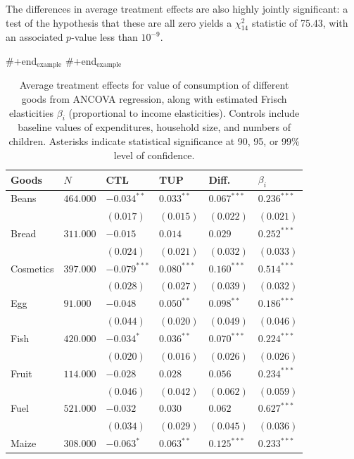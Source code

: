 \documentclass[12pt,letterpaper]{article}
\begin{document}
The differences in average treatment effects are also highly jointly
significant: a test of the hypothesis that these are all zero
yields a \(\chi^2_{14}\) statistic of 75.43, with an associated
\(p\)-value less than \(10^{-9}\).  

\#+end\(_{\text{example}}\)
\#+end\(_{\text{example}}\)

\begin{table}[htb]
\caption{\label{tab:orgtable1}
Average treatment effects for value of consumption of different goods from ANCOVA regression, along with estimated Frisch elasticities \(\beta_i\) (proportional to income elasticities).  Controls include baseline values of expenditures, household size, and numbers of children.  Asterisks indicate statistical significance at 90, 95, or 99\% level of confidence.}
\centering
\begin{tabular}{llllll}
Goods & \(N\) & CTL & TUP & Diff. & \(\beta_i\)\\
\hline
Beans & \(464.000\) & \(-0.034^{**}\) & \(0.033^{**}\) & \(0.067^{***}\) & \(0.236^{***}\)\\
 &  & \((0.017)\) & \((0.015)\) & \((0.022)\) & \((0.021)\)\\
Bread & \(311.000\) & \(-0.015\) & \(0.014\) & \(0.029\) & \(0.252^{***}\)\\
 &  & \((0.024)\) & \((0.021)\) & \((0.032)\) & \((0.033)\)\\
Cosmetics & \(397.000\) & \(-0.079^{***}\) & \(0.080^{***}\) & \(0.160^{***}\) & \(0.514^{***}\)\\
 &  & \((0.028)\) & \((0.027)\) & \((0.039)\) & \((0.032)\)\\
Egg & \(91.000\) & \(-0.048\) & \(0.050^{**}\) & \(0.098^{**}\) & \(0.186^{***}\)\\
 &  & \((0.044)\) & \((0.020)\) & \((0.049)\) & \((0.046)\)\\
Fish & \(420.000\) & \(-0.034^{*}\) & \(0.036^{**}\) & \(0.070^{***}\) & \(0.224^{***}\)\\
 &  & \((0.020)\) & \((0.016)\) & \((0.026)\) & \((0.026)\)\\
Fruit & \(114.000\) & \(-0.028\) & \(0.028\) & \(0.056\) & \(0.234^{***}\)\\
 &  & \((0.046)\) & \((0.042)\) & \((0.062)\) & \((0.059)\)\\
Fuel & \(521.000\) & \(-0.032\) & \(0.030\) & \(0.062\) & \(0.627^{***}\)\\
 &  & \((0.034)\) & \((0.029)\) & \((0.045)\) & \((0.036)\)\\
Maize & \(308.000\) & \(-0.063^{*}\) & \(0.063^{**}\) & \(0.125^{***}\) & \(0.233^{***}\)\\

\end{tabular}
\end{table}
\end{document}
